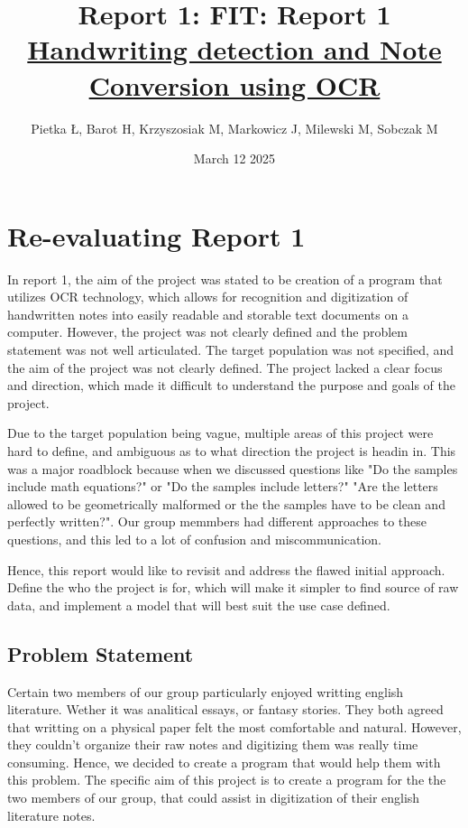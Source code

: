 \documentclass[twoside,a4paper]{article}
\title{Report 1: }
\title{\textbf{FIT: Report 1} \\[1ex] \Large \underline{Handwriting detection and Note Conversion using OCR}
}
\author{Pietka Ł, Barot H, Krzyszosiak M, Markowicz J, Milewski M, Sobczak M}
\date{March 12 2025}
\begin{document}
\maketitle
\tableofcontents
\newpage
\section{Re-evaluating Report 1}

In report 1, the aim of the project was stated to be creation of  a program that utilizes OCR technology, which allows for recognition and digitization of handwritten notes 
into easily readable and storable text documents on a computer. However, the project was not clearly defined and the problem statement was not well articulated.
The target population was not specified, and the aim of the project was not clearly defined. The project lacked a clear focus and direction, which made it difficult to understand the purpose and goals of the project.

Due to the target population being vague, multiple areas of this project were hard to define, and ambiguous as to what direction the project is headin in.
This was a major roadblock because when we discussed questions like "Do the samples include math equations?" or "Do the samples include letters?" "Are the letters allowed to be geometrically malformed or the the samples have to be
clean and perfectly written?". Our group memmbers had different approaches to these questions, and this led to a lot of confusion and miscommunication.

Hence, this report would like to revisit and address the flawed initial approach. Define the who the project is for, which will make it simpler to find source of raw data,
and implement a model that will best suit the use case defined.

\subsection{Problem Statement}
Certain two members of our group particularly enjoyed writting english literature. Wether it was analitical essays, or fantasy stories. They both agreed that writting on a physical paper felt the most comfortable and natural. However, they couldn't organize their raw notes and digitizing them was 
really time consuming. Hence, we decided to create a program that would help them with this problem. The specific aim of this project is to create a program
for the the two members of our group, that could assist in digitization of their english literature notes.
\end{document}
